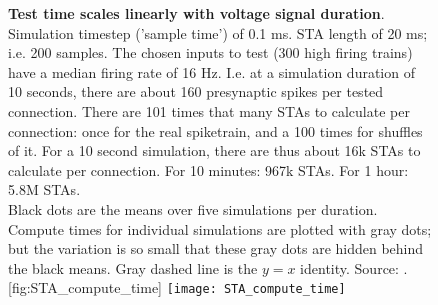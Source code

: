 \begin{figure}
    \begin{sidecaption}
        {\textbf{Test time scales linearly with voltage signal duration}.\\
        Simulation timestep ('sample time') of 0.1 ms. STA length of 20 ms; i.e. 200 samples.
        The chosen inputs to test (300 high firing trains) have a median firing rate of 16 Hz. I.e. at a simulation duration of 10 seconds, there are about 160 presynaptic spikes per tested connection. There are 101 times that many STAs to calculate per connection: once for the real spiketrain, and a 100 times for shuffles of it. For a 10 second simulation, there are thus about 16k STAs to calculate per connection.
        For 10 minutes: 967k STAs. For 1 hour: 5.8M STAs.\\
        Black dots are the means over five simulations per duration. Compute times for individual simulations are plotted with gray dots; but the variation is so small that these gray dots are hidden behind the black means. Gray dashed line is the $y = x$ identity.  Source: .}
        [fig:STA_compute_time]
        \texttt{[image: STA\_compute\_time]}
    \end{sidecaption}
\end{figure}
